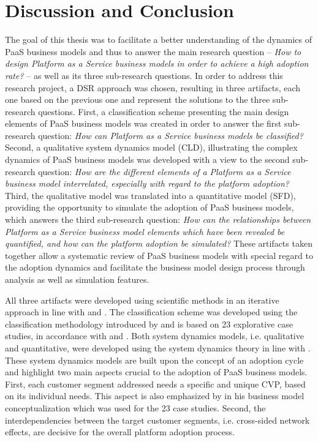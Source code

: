 \chapter{Discussion and Conclusion}\label{ch:dc}

The goal of this thesis was to facilitate a better understanding of the dynamics of \acf{PaaS} business models and thus to answer the main research question -- \textit{How to design Platform as a Service business models in order to achieve a high adoption rate?} -- as well as its three sub-research questions. In order to address this research project, a \acf{DSR} approach was chosen, resulting in three artifacts, each one based on the previous one and represent the solutions to the three sub-research questions. First, a classification scheme presenting the main design elements of \ac{PaaS} business models was created in order to answer the first sub-research question: \textit{How can Platform as a Service business models be classified?} Second, a qualitative system dynamics model (\acf{CLD}), illustrating the complex dynamics of \ac{PaaS} business models was developed with a view to the second sub-research question: \textit{How are the different elements of a Platform as a Service business model interrelated, especially with regard to the platform adoption?} Third, the qualitative model was translated into a quantitative model (\acf{SFD}), providing the opportunity to simulate the adoption of \ac{PaaS} business models, which answers the third sub-research question: \textit{How can the relationships between Platform as a Service business model elements which have been revealed be quantified, and how can the platform adoption be simulated?} These artifacts taken together allow a systematic review of \ac{PaaS} business models with special regard to the adoption dynamics and facilitate the business model design process through analysis as well as simulation features. 

All three artifacts were developed using scientific methods in an iterative approach in line with \citet{Hevner2007} and \citet{Peffers2007}. The classification scheme was developed using the classification methodology introduced by \citet{Fettke2003} and is based on 23 explorative case studies, in accordance with \citet{Eisenhardt1989} and \citet{Yin2008}. Both system dynamics models, i.e. qualitative and quantitative, were developed using the system dynamics theory in line with \citet{Sterman2000,Sterman2001}. These system dynamics models are built upon the concept of an adoption cycle \citep{Sterman2001} and highlight two main aspects crucial to the adoption of \ac{PaaS} business models. First, each customer segment addressed needs a specific and unique \acf{CVP}, based on its individual needs. This aspect is also emphasized by \citet{Johnson2008} in his business model conceptualization which was used for the 23 case studies. Second, the interdependencies between the target customer segments, i.e. cross-sided network effects, are decisive for the overall platform adoption process.

